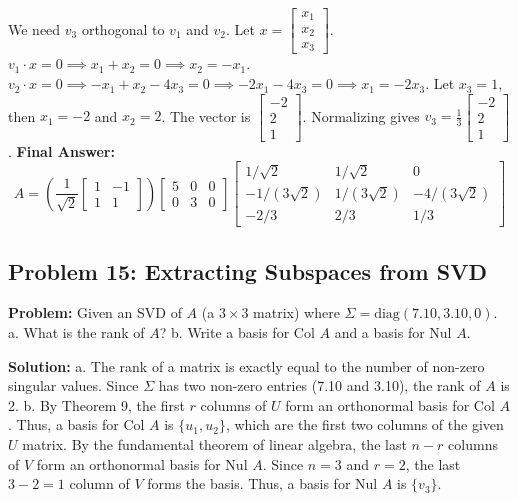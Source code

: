 \documentclass[11pt, letterpaper]{article}
\theoremstyle{definition}
\theoremstyle{remark}
\begin{document}
We need $v_3$ orthogonal to $v_1$ and $v_2$. Let $x = \begin{bmatrix} x_1 \\ x_2 \\ x_3 \end{bmatrix}$.
$v_1 \cdot x = 0 \implies x_1 + x_2 = 0 \implies x_2 = -x_1$.
$v_2 \cdot x = 0 \implies -x_1 + x_2 - 4x_3 = 0 \implies -2x_1 - 4x_3 = 0 \implies x_1 = -2x_3$.
Let $x_3 = 1$, then $x_1 = -2$ and $x_2 = 2$. The vector is $\begin{bmatrix} -2 \\ 2 \\ 1 \end{bmatrix}$. Normalizing gives $v_3 = \frac{1}{3}\begin{bmatrix} -2 \\ 2 \\ 1 \end{bmatrix}$.
\textbf{Final Answer:}
\[
A = \left( \frac{1}{\sqrt{2}} \begin{bmatrix} 1 & -1 \\ 1 & 1 \end{bmatrix} \right) \begin{bmatrix} 5 & 0 & 0 \\ 0 & 3 & 0 \end{bmatrix} \begin{bmatrix} 1/\sqrt{2} & 1/\sqrt{2} & 0 \\ -1/(3\sqrt{2}) & 1/(3\sqrt{2}) & -4/(3\sqrt{2}) \\ -2/3 & 2/3 & 1/3 \end{bmatrix}
\]

\vspace{1em}
\subsection{Problem 15: Extracting Subspaces from SVD}
\textbf{Problem:} Given an SVD of $A$ (a $3 \times 3$ matrix) where $\Sigma = \text{diag}(7.10, 3.10, 0)$.
a. What is the rank of $A$?
b. Write a basis for $\text{Col } A$ and a basis for $\text{Nul } A$.

\textbf{Solution:}
a. The rank of a matrix is exactly equal to the number of non-zero singular values. Since $\Sigma$ has two non-zero entries (7.10 and 3.10), the rank of $A$ is 2.
b. By Theorem 9, the first $r$ columns of $U$ form an orthonormal basis for $\text{Col } A$. Thus, a basis for $\text{Col } A$ is $\{u_1, u_2\}$, which are the first two columns of the given $U$ matrix.
By the fundamental theorem of linear algebra, the last $n-r$ columns of $V$ form an orthonormal basis for $\text{Nul } A$. Since $n=3$ and $r=2$, the last $3-2=1$ column of $V$ forms the basis. Thus, a basis for $\text{Nul } A$ is $\{v_3\}$.
\end{document}
